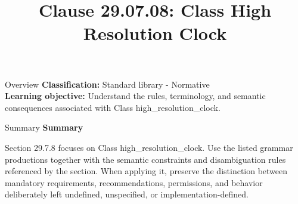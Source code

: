 \documentclass[10pt,letterpaper]{article}
\title{Clause 29.07.08: Class High Resolution Clock}
\author{}
\date{}
\begin{document}
\maketitle
\begin{CornellOverviewBox}{Overview}
\textbf{Classification:} Standard library - Normative\\[2pt]
\textbf{Learning objective:} Understand the rules, terminology, and semantic consequences associated with Class high\_resolution\_clock.
\end{CornellOverviewBox}\begin{CornellSummaryBox}{Summary}
{\sffamily\bfseries\color{Accent} Summary}\par\vspace{3pt}Section 29.7.8 focuses on Class high\_resolution\_clock. Use the listed grammar productions together with the semantic constraints and disambiguation rules referenced by the section. When applying it, preserve the distinction between mandatory requirements, recommendations, permissions, and behavior deliberately left undefined, unspecified, or implementation-defined.
\end{CornellSummaryBox}
\end{document}
